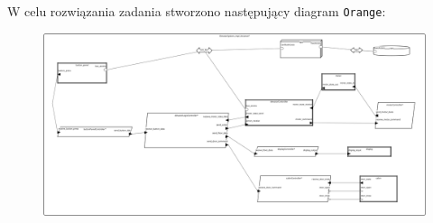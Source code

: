 \documentclass{article}
\begin{document}
W celu rozwiązania zadania stworzono następujący diagram \texttt{Orange}:


\begin{figure}[H]
    \centering
    \includegraphics[width=1.2\linewidth]{./images/schema.png}
\end{figure}
\end{document}
